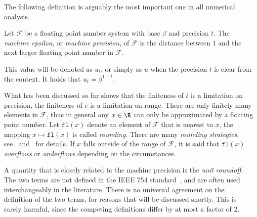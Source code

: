 The following definition is arguably the most important one in all numerical analysis.
\begin{definizione}\label{def:macheps}
	Let $\mathcal{F}$ be a floating point number system with base $\beta$ and precision $t$. The \emph{machine epsilon}, or \emph{machine precision}, of $\mathcal{F}$ is the distance between $1$ and the next larger floating point number in $\mathcal{F}$. 
	
	This value will be denoted as $u_t$, or simply as $u$ when the precision $t$ is clear from the context. It holds that $u_t=\beta^{1-t}$.
\end{definizione}

What has been discussed so far shows that the finiteness of $t$ is a limitation on precision, the finiteness of $e$ is a limitation on range.
There are only finitely many elements in $\mathcal{F}$, thus in general any $x\in\R$ can only be approximated by a floating point number.
Let $\mathtt{fl}(x)$ denote an element of $\mathcal{F}$ that is nearest to $x$, the mapping $x\mapsto\mathtt{fl}(x)$ is called \emph{rounding}. There are many \emph{rounding strategies}, see~\cite{higham:accuracy_book} and~\cite{article:IEEE754_2019} for details. If $x$ falls outside of the range of $\mathcal{F}$, it is said that $\mathtt{fl}(x)$ \emph{overflows} or \emph{underflows} depending on the circumstances.


A quantity that is closely related to the machine precision is the \emph{unit roundoff}. The two terms are not defined in the \textsc{IEEE} 754 standard~\cite{article:IEEE754_2019}, and are often used interchangeably in the literature. There is no universal agreement on the definition of the two terms, for reasons that will be discussed shortly. This is rarely harmful, since the competing definitions differ by at most a factor of $2$.	

